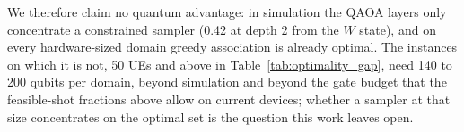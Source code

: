 We therefore claim no quantum advantage: in simulation the QAOA layers only concentrate a constrained sampler (0.42
at depth 2 from the $W$ state), and on every hardware-sized domain greedy association is already optimal. The instances on which it is not, 50 UEs and above in Table~\ref{tab:optimality_gap},
need 140 to 200 qubits per domain, beyond simulation and beyond the gate budget that the feasible-shot fractions
above allow on current devices; whether a sampler at that size concentrates on the optimal set is the question this
work leaves open.
